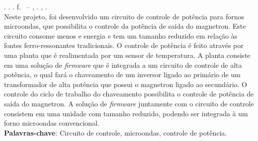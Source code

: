 
\begin{resumo}[RESUMO]
\begin{SingleSpacing}

\imprimirautorcitacao. \imprimirtitulo. \imprimirdata. \pageref {LastPage} f. \imprimirprojeto\ – \imprimirprograma, \imprimirinstituicao. \imprimirlocal, \imprimirdata.\\


Neste projeto, foi desenvolvido um circuito de controle de potência para fornos microondas, que possibilita o controle da potência de saída do magnetron. Este circuito consome menos e energia e tem um tamanho reduzido em relação às fontes ferro-ressonantes tradicionais. O controle de potência é feito através por uma planta que é realimentada por um sensor de temperatura. A planta consiste em uma solução de \textit{firmware} que é integrada a um circuito de controle de alta potência, o qual fará o chaveamento de um inversor ligado ao primário de um transformador de alta potência que possui o magnetron ligado ao secundário. O controle do ciclo de trabalho do chaveamento possibilita o controle de potência de saída do magnetron. A solução de \textit{firmware} juntamente com o circuito de controle consistem em uma unidade com tamanho reduzido, podendo ser integrada à um forno microondas convencional.\\

\textbf{Palavras-chave}: Circuito de controle, microondas, controle de potência.

\end{SingleSpacing}
\end{resumo}

